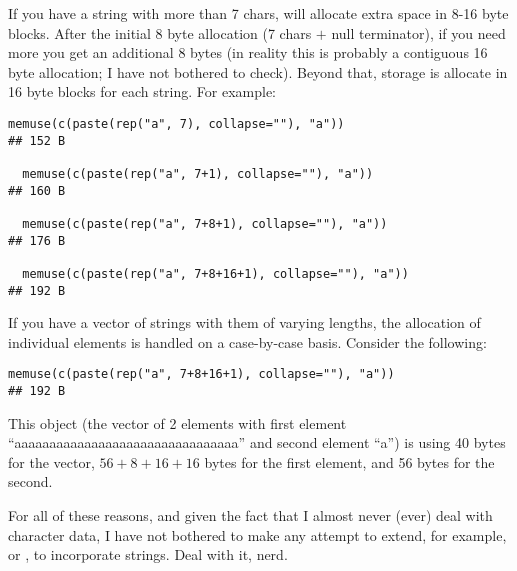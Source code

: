 If you have a string with more than 7 chars, \R will allocate extra 
space in 8-16 byte blocks.  After the initial 8 byte allocation (7 chars $+$ 
null terminator), if you need more you get an additional 8 bytes (in reality 
this is probably a contiguous 16 byte allocation; I have not bothered to check). 
 Beyond that, storage is allocate in 16 byte blocks for each string.  For 
example:
\begin{lstlisting}[language=rr]
memuse(c(paste(rep("a", 7), collapse=""), "a")) 
## 152 B

  memuse(c(paste(rep("a", 7+1), collapse=""), "a")) 
## 160 B

  memuse(c(paste(rep("a", 7+8+1), collapse=""), "a")) 
## 176 B

  memuse(c(paste(rep("a", 7+8+16+1), collapse=""), "a")) 
## 192 B
\end{lstlisting}

If you have a vector of strings with them of varying lengths, the allocation of 
individual elements is handled on a case-by-case basis.  Consider the 
following:
\begin{lstlisting}[language=rr]
  memuse(c(paste(rep("a", 7+8+16+1), collapse=""), "a")) 
## 192 B
\end{lstlisting}

This object (the vector of 2 elements with first element 
``aaaaaaaaaaaaaaaaaaaaaaaaaaaaaaaa'' and second element ``a'') is using 40 
bytes for the vector, $56+8+16+16$ bytes for the first element, and 56 bytes for 
the second.

For all of these reasons, and given the fact that I almost never (ever) deal 
with character data, I have not bothered to make any attempt to extend, for 
example,  or , to incorporate strings.  Deal 
with it, nerd.

